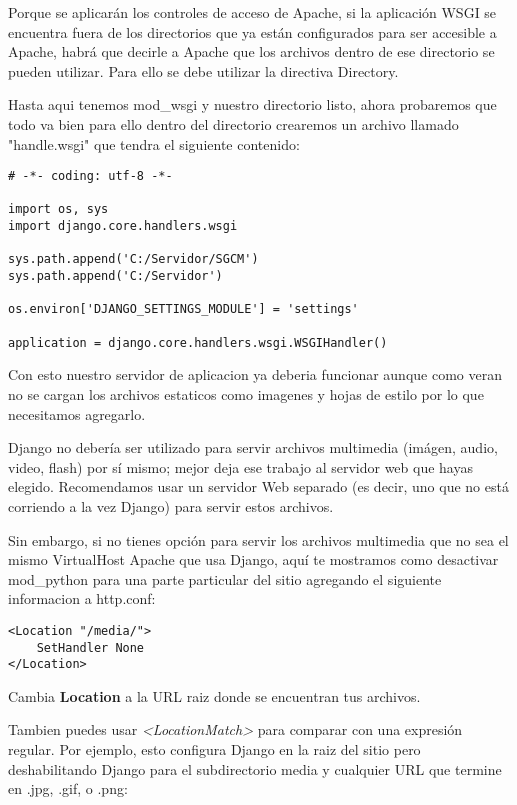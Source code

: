Porque se aplicarán los controles de acceso de Apache, si la aplicación WSGI se
 encuentra fuera de los directorios que ya están configurados para ser accesible a
  Apache, habrá que decirle a Apache que los archivos dentro de ese directorio se
  pueden utilizar. Para ello se debe utilizar la directiva Directory.

Hasta aqui tenemos mod\_wsgi y nuestro directorio listo, ahora probaremos que
todo va bien para ello dentro del directorio crearemos un archivo llamado
"handle.wsgi" que tendra el siguiente contenido:

\begin{lstlisting}[style=Python]
# -*- coding: utf-8 -*-

import os, sys
import django.core.handlers.wsgi

sys.path.append('C:/Servidor/SGCM')
sys.path.append('C:/Servidor')

os.environ['DJANGO_SETTINGS_MODULE'] = 'settings'

application = django.core.handlers.wsgi.WSGIHandler()

\end{lstlisting}
\vspace{0.1cm}


Con esto nuestro servidor de aplicacion ya deberia funcionar aunque como veran
no se cargan los archivos estaticos como imagenes y hojas de estilo por lo
que necesitamos agregarlo.


Django no debería ser utilizado para servir archivos multimedia (imágen, audio,
video, flash) por sí mismo; mejor deja ese trabajo al servidor web que hayas
elegido. Recomendamos usar un servidor Web separado (es decir, uno que no está
corriendo a la vez Django) para servir estos archivos. 

Sin embargo, si no tienes opción para servir los archivos multimedia que no sea
el mismo VirtualHost Apache que usa Django, aquí te mostramos como desactivar
mod\_python para una parte particular del sitio agregando el siguiente
informacion a http.conf:

\begin{lstlisting}[style=consola]
<Location "/media/">
    SetHandler None
</Location>
\end{lstlisting}
\vspace{0.1cm}

Cambia \textbf{Location} a la URL raiz donde se encuentran tus archivos.

Tambien puedes usar \textit{<LocationMatch>} para comparar con una expresión regular.
Por ejemplo, esto configura Django en la raiz del sitio pero deshabilitando
Django para el subdirectorio media y cualquier URL que termine en
.jpg, .gif, o .png:

